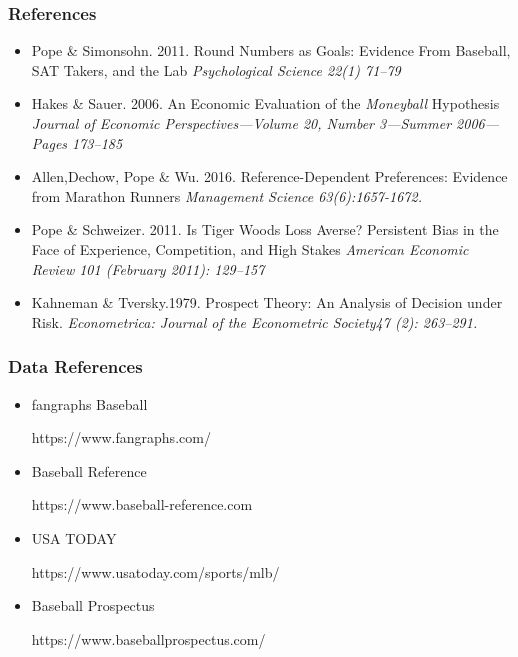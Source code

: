 \documentclass[dvipdfmx,12pt]{beamer}
\begin{document}
\begin{frame}\frametitle{References}
  \begin{itemize}
    \footnotesize
    \item Pope \& Simonsohn. 2011.
    Round Numbers as Goals: Evidence From Baseball, SAT Takers, and the Lab
    \textit{Psychological Science 22(1) 71–79}

    \item Hakes \& Sauer. 2006.
    An Economic Evaluation of the \textit{Moneyball} Hypothesis
    \textit{Journal of Economic Perspectives—Volume 20,
    Number 3—Summer 2006—Pages 173–185}

    \item Allen,Dechow, Pope \& Wu. 2016.
    Reference-Dependent Preferences: Evidence from
    Marathon Runners
    \textit{Management Science 63(6):1657-1672.}

    \item Pope \& Schweizer. 2011.
    Is Tiger Woods Loss Averse? Persistent Bias in the
    Face of Experience, Competition, and High Stakes
    \textit{American Economic Review 101 (February 2011): 129–157}

    \item Kahneman \& Tversky.1979.
    Prospect Theory: An Analysis of Decision under Risk.
    \textit{Econometrica:  Journal of the Econometric Society47 (2): 263–291.}

  \end{itemize}
\end{frame}

\begin{frame}\frametitle{Data References}
  \begin{itemize}
    \item fangraphs Baseball

    https://www.fangraphs.com/

    \item Baseball Reference

    https://www.baseball-reference.com

    \item USA TODAY

    https://www.usatoday.com/sports/mlb/

    \item Baseball Prospectus

    https://www.baseballprospectus.com/
  \end{itemize}
\end{frame}
\end{document}
